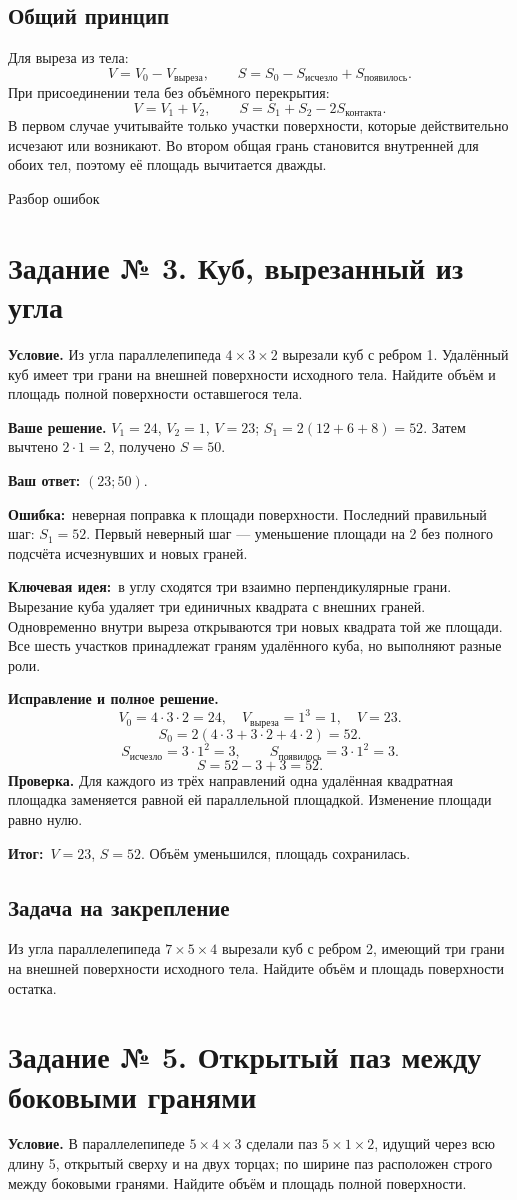 \documentclass[a4paper,12pt]{article}
\newcommand{\err}{\textcolor{red!70!black}{\textbf{Ошибка:}}}
\newcommand{\idea}{\textcolor{blue!60!black}{\textbf{Ключевая идея:}}}
\newcommand{\result}{\textcolor{teal!60!black}{\textbf{Итог:}}}
\newcommand{\task}[2]{\clearpage\phantomsection\label{task:#1}\section*{Задание № #1. #2}}
\begin{document}
\subsection*{Общий принцип}
Для выреза из тела:
\[V=V_0-V_{\text{выреза}},\qquad S=S_0-S_{\text{исчезло}}+S_{\text{появилось}}.\]
При присоединении тела без объёмного перекрытия:
\[V=V_1+V_2,\qquad S=S_1+S_2-2S_{\text{контакта}}.\]
В первом случае учитывайте только участки поверхности, которые действительно исчезают или возникают. Во втором общая грань становится внутренней для обоих тел, поэтому её площадь вычитается дважды.
\clearpage
\thispagestyle{empty}
\vspace*{\fill}\begin{center}{\LARGE\color{accent} Разбор ошибок}\end{center}\vspace*{\fill}
\task{3}{Куб, вырезанный из угла}
\textbf{Условие.} Из угла параллелепипеда $4\times3\times2$ вырезали куб с ребром 1. Удалённый куб имеет три грани на внешней поверхности исходного тела. Найдите объём и площадь полной поверхности оставшегося тела.

\textbf{Ваше решение.} $V_1=24$, $V_2=1$, $V=23$; $S_1=2(12+6+8)=52$. Затем вычтено $2\cdot1=2$, получено $S=50$.

\textbf{Ваш ответ:} $(23;50)$.

\err\ неверная поправка к площади поверхности. Последний правильный шаг: $S_1=52$. Первый неверный шаг --- уменьшение площади на 2 без полного подсчёта исчезнувших и новых граней.

\idea\ в углу сходятся три взаимно перпендикулярные грани. Вырезание куба удаляет три единичных квадрата с внешних граней. Одновременно внутри выреза открываются три новых квадрата той же площади. Все шесть участков принадлежат граням удалённого куба, но выполняют разные роли.

\textbf{Исправление и полное решение.}
\[V_0=4\cdot3\cdot2=24,\quad V_{\text{выреза}}=1^3=1,\quad V=23.\]
\[S_0=2(4\cdot3+3\cdot2+4\cdot2)=52.\]
\[S_{\text{исчезло}}=3\cdot1^2=3,\qquad S_{\text{появилось}}=3\cdot1^2=3.\]
\[S=52-3+3=52.\]
\textbf{Проверка.} Для каждого из трёх направлений одна удалённая квадратная площадка заменяется равной ей параллельной площадкой. Изменение площади равно нулю.

\result\ $V=23$, $S=52$. Объём уменьшился, площадь сохранилась.
\subsection*{Задача на закрепление}
Из угла параллелепипеда $7\times5\times4$ вырезали куб с ребром 2, имеющий три грани на внешней поверхности исходного тела. Найдите объём и площадь поверхности остатка.
\task{5}{Открытый паз между боковыми гранями}
\textbf{Условие.} В параллелепипеде $5\times4\times3$ сделали паз $5\times1\times2$, идущий через всю длину 5, открытый сверху и на двух торцах; по ширине паз расположен строго между боковыми гранями. Найдите объём и площадь полной поверхности.
\end{document}
